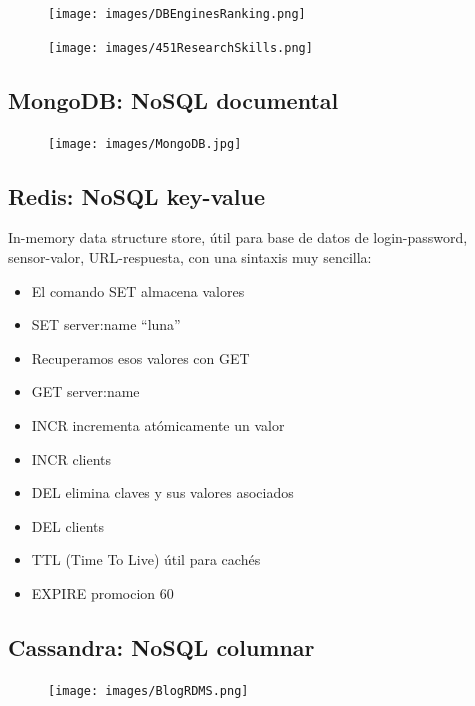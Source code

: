\documentclass[]{book}
\providecommand{\tightlist}{%
  \setlength{\itemsep}{0pt}\setlength{\parskip}{0pt}}
\begin{document}
\begin{figure}
\centering
\texttt{[image: images/DBEnginesRanking.png]}
\caption{}
\end{figure}

\begin{figure}
\centering
\texttt{[image: images/451ResearchSkills.png]}
\caption{}
\end{figure}

\subsection{MongoDB: NoSQL documental}\label{mongodb-nosql-documental}

\begin{figure}
\centering
\texttt{[image: images/MongoDB.jpg]}
\caption{}
\end{figure}

\subsection{Redis: NoSQL key-value}\label{redis-nosql-key-value}

In-memory data structure store, útil para base de datos de
login-password, sensor-valor, URL-respuesta, con una sintaxis muy
sencilla:

\begin{itemize}
\tightlist
\item
  El comando SET almacena valores
\item
  SET server:name ``luna''
\item
  Recuperamos esos valores con GET
\item
  GET server:name
\item
  INCR incrementa atómicamente un valor
\item
  INCR clients
\item
  DEL elimina claves y sus valores asociados
\item
  DEL clients
\item
  TTL (Time To Live) útil para cachés
\item
  EXPIRE promocion 60
\end{itemize}

\subsection{Cassandra: NoSQL columnar}\label{cassandra-nosql-columnar}

\begin{figure}
\centering
\texttt{[image: images/BlogRDMS.png]}
\caption{}
\end{figure}
\end{document}
